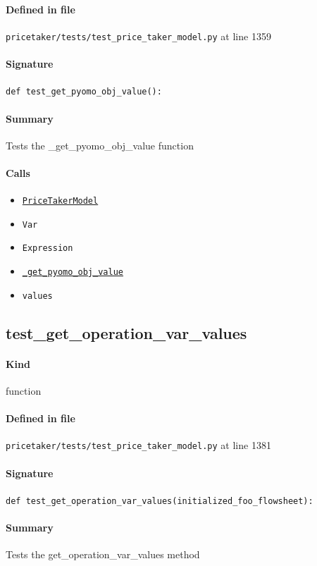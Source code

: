 \documentclass[11pt]{report}
\begin{document}
\paragraph{Defined in file} \texttt{pricetaker/tests/test\_price\_taker\_model.py} at line 1359
\paragraph{Signature} \texttt{def test\_get\_pyomo\_obj\_value():}
\paragraph{Summary} Tests the \_get\_pyomo\_obj\_value function
\paragraph{Calls}
\begin{itemize}[leftmargin=*]
  \item \hyperref[def:pricetaker-price_taker_model.py:PriceTakerModel:L161]{\texttt{PriceTakerModel}}
  \item \texttt{Var}
  \item \texttt{Expression}
  \item \hyperref[def:pricetaker-price_taker_model.py:PriceTakerModel._get_pyomo_obj_value:L1191]{\texttt{\_get\_pyomo\_obj\_value}}
  \item \texttt{values}
\end{itemize}
\subsection{test\_get\_operation\_var\_values}
\label{def:pricetaker-tests-test_price_taker_model.py:test_get_operation_var_values:L1381}
\paragraph{Kind} function
\paragraph{Defined in file} \texttt{pricetaker/tests/test\_price\_taker\_model.py} at line 1381
\paragraph{Signature} \texttt{def test\_get\_operation\_var\_values(initialized\_foo\_flowsheet):}
\paragraph{Summary} Tests the get\_operation\_var\_values method
\end{document}
